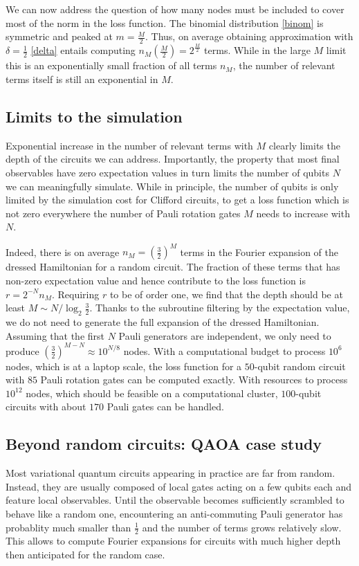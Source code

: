 \documentclass[twocolumn, amsfonts, amssymb, aps, nofootinbib]{revtex4-2}
\begin{document}
We can now address the question of how many nodes must be included to cover most of the norm in the loss function. The binomial distribution \eqref{binom} is symmetric and peaked at $m=\frac{M}{2}$. Thus, on average obtaining approximation with $\delta=\frac12$ \eqref{delta} entails computing $n_M(\frac{M}{2})=2^{\frac{M}2}$ terms. While in the large $M$ limit this is an exponentially small fraction of all terms $n_M$, the number of relevant terms itself is still an exponential in $M$.
\subsection{Limits to the simulation}
Exponential increase in the number of relevant terms with $M$ clearly limits the depth of the circuits we can address. Importantly, the property that most final observables have zero expectation values in turn limits the number of qubits $N$ we can meaningfully simulate. While in principle, the number of qubits is only limited by the simulation cost for Clifford circuits, to get a loss function which is not zero everywhere the number of Pauli rotation gates $M$ needs to increase with $N$.

Indeed, there is on average $n_M=\left(\frac32\right)^M$ terms in the Fourier expansion of the dressed Hamiltonian for a random circuit. The fraction of these terms that has non-zero expectation value and hence contribute to the loss function is $r=2^{-N}n_M$. Requiring $r$ to be of order one, we find that the depth should be at least $M\sim N/\log_2\frac32$. Thanks to the subroutine filtering by the expectation value, we do not need to generate the full expansion of the dressed Hamiltonian. Assuming that the first $N$ Pauli generators are independent, we only need to produce $\left(\frac32\right)^{M-N}\approx 10^{N/8}$ nodes. With a computational budget to process $10^6$ nodes, which is at a laptop scale, the loss function for a $50$-qubit random circuit with $85$ Pauli rotation gates can be computed exactly. With resources to process $10^{12}$ nodes, which should be feasible on a computational cluster, $100$-qubit circuits with about $170$ Pauli gates can be handled.

\subsection*{Beyond random circuits: QAOA case study}
Most variational quantum circuits appearing in practice are far from random. Instead, they are usually composed of local gates acting on a few qubits each and feature local observables. Until the observable becomes sufficiently scrambled to behave like a random one, encountering an anti-commuting Pauli generator has probablity much smaller than $\frac12$ and the number of terms grows relatively slow. This allows to compute Fourier expansions for circuits with much higher depth then anticipated for the random case.
\end{document}
